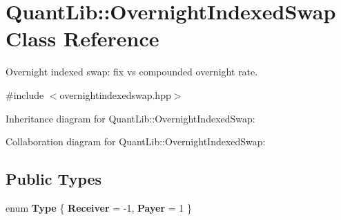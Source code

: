 \section{Quant\+Lib\+:\+:Overnight\+Indexed\+Swap Class Reference}
\label{class_quant_lib_1_1_overnight_indexed_swap}


Overnight indexed swap\+: fix vs compounded overnight rate.  




{\ttfamily \#include $<$overnightindexedswap.\+hpp$>$}



Inheritance diagram for Quant\+Lib\+:\+:Overnight\+Indexed\+Swap\+:


Collaboration diagram for Quant\+Lib\+:\+:Overnight\+Indexed\+Swap\+:
\subsection*{Public Types}
\begin{DoxyCompactItemize}
\item 
enum {\bfseries Type} \{ {\bfseries Receiver} = -\/1, 
{\bfseries Payer} = 1
 \}\label{class_quant_lib_1_1_overnight_indexed_swap_a12311eda4739f7c84ed87fd42959f311}

\end{DoxyCompactItemize}
